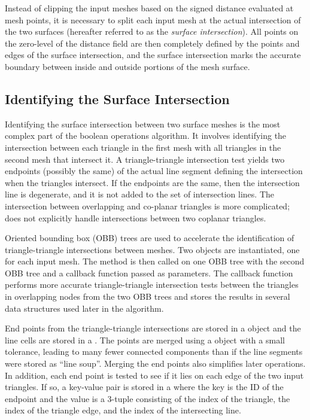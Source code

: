 \documentclass{InsightArticle}
\begin{document}
Instead of clipping the input meshes based on the signed distance evaluated at mesh points, it is necessary to split each input mesh at the actual intersection of the two surfaces (hereafter referred to as the \emph{surface intersection}). All points on the zero-level of the distance field are then completely defined by the points and edges of the surface intersection, and the surface intersection marks the accurate boundary between inside and outside portions of the mesh surface.

\subsection{Identifying the Surface Intersection}

Identifying the surface intersection between two surface meshes is the most complex part of the boolean operations algorithm. It involves identifying the intersection between each triangle in the first mesh with all triangles in the second mesh that intersect it. A triangle-triangle intersection test yields two endpoints (possibly the same) of the actual line segment defining the intersection when the triangles intersect. If the endpoints are the same, then the intersection line is degenerate, and it is not added to the set of intersection lines. The intersection between overlapping and co-planar triangles is more complicated;  does not explicitly handle intersections between two coplanar triangles.

Oriented bounding box (OBB) trees are used to accelerate the identification of triangle-triangle intersections between meshes. Two  objects are instantiated, one for each input mesh. The method  is then called on one OBB tree with the second OBB tree and a callback function passed as parameters. The callback function performs more accurate triangle-triangle intersection tests between the triangles in overlapping nodes from the two OBB trees and stores the results in several data structures used later in the algorithm.

End points from the triangle-triangle intersections are stored in a  object and the line cells are stored in a . The points  are merged using a  object with a small tolerance, leading to many fewer connected components than if the line segments were stored as ``line soup''. Merging the end points also simplifies later operations. In addition, each end point is tested to see if it lies on each edge of the two input triangles. If so, a key-value pair is stored in a  where the key is the ID of the endpoint and the value is a 3-tuple consisting of the index of the triangle, the index of the triangle edge, and the index of the intersecting line.
\end{document}
